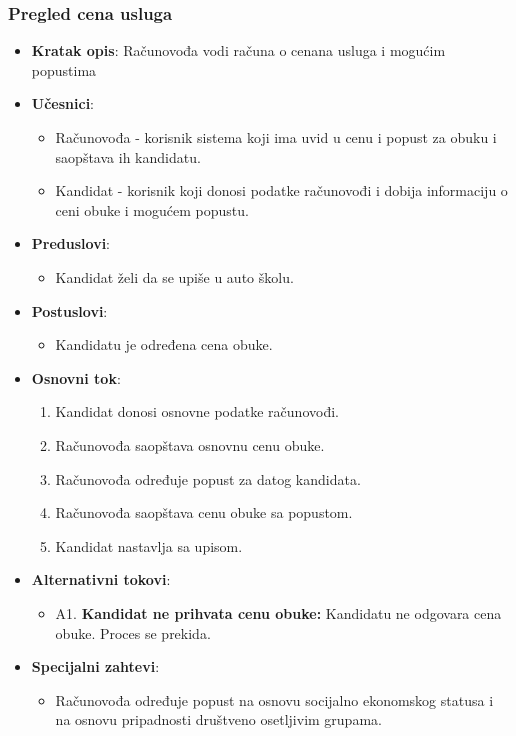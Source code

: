 \subsubsection{Pregled cena usluga}
\label{subsubsec:vozni park}
\begin{itemize}
  \item \textbf{Kratak opis}: Računovođa vodi računa o cenana usluga i mogućim popustima

  \item \textbf{Učesnici}:
    \begin{itemize}
    \item Računovođa - korisnik sistema koji ima uvid u cenu i popust za obuku i saopštava ih kandidatu.
    \item Kandidat - korisnik koji donosi podatke računovođi i dobija informaciju o ceni obuke i mogućem popustu.
    \end{itemize}
  \item \textbf{Preduslovi}:
    \begin{itemize}
    \item  Kandidat želi da se upiše u auto školu.
    \end{itemize}
  \item \textbf{Postuslovi}:
      \begin{itemize}
      \item  Kandidatu je određena cena obuke.
      \end{itemize}
  \item \textbf{Osnovni tok}:
      \begin{enumerate}
        \item Kandidat donosi osnovne podatke računovođi.
        \item Računovođa saopštava osnovnu cenu obuke.
        \item Računovođa određuje popust za datog kandidata.
        \item Računovođa saopštava cenu obuke sa popustom.
        \item Kandidat nastavlja sa upisom.
      \end{enumerate}

  \item \textbf{Alternativni tokovi}:
      \begin{itemize}
        \item A1. \textbf{Kandidat ne prihvata cenu obuke:}
        Kandidatu ne odgovara cena obuke. Proces se prekida.
      \end{itemize}

      
  \item \textbf{Specijalni zahtevi}:
      \begin{itemize}
        \item Računovođa određuje popust na osnovu socijalno ekonomskog statusa i na osnovu pripadnosti društveno osetljivim grupama.
      \end{itemize}
\end{itemize}

